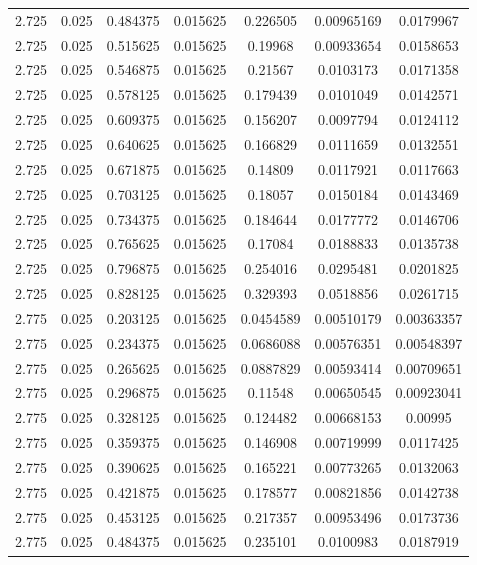 \begin{table}[bh]
\begin{center}
{\begin{tabular}{ccccccc}
2.725	 & 0.025 & 	0.484375	 & 0.015625	 & 0.226505	 & 0.00965169	 & 0.0179967 \\ 
2.725	 & 0.025 & 	0.515625	 & 0.015625	 & 0.19968	 & 0.00933654	 & 0.0158653 \\ 
2.725	 & 0.025 & 	0.546875	 & 0.015625	 & 0.21567	 & 0.0103173	 & 0.0171358 \\ 
2.725	 & 0.025 & 	0.578125	 & 0.015625	 & 0.179439	 & 0.0101049	 & 0.0142571 \\ 
2.725	 & 0.025 & 	0.609375	 & 0.015625	 & 0.156207	 & 0.0097794	 & 0.0124112 \\ 
2.725	 & 0.025 & 	0.640625	 & 0.015625	 & 0.166829	 & 0.0111659	 & 0.0132551 \\ 
2.725	 & 0.025 & 	0.671875	 & 0.015625	 & 0.14809	 & 0.0117921	 & 0.0117663 \\ 
2.725	 & 0.025 & 	0.703125	 & 0.015625	 & 0.18057	 & 0.0150184	 & 0.0143469 \\ 
2.725	 & 0.025 & 	0.734375	 & 0.015625	 & 0.184644	 & 0.0177772	 & 0.0146706 \\ 
2.725	 & 0.025 & 	0.765625	 & 0.015625	 & 0.17084	 & 0.0188833	 & 0.0135738 \\ 
2.725	 & 0.025 & 	0.796875	 & 0.015625	 & 0.254016	 & 0.0295481	 & 0.0201825 \\ 
2.725	 & 0.025 & 	0.828125	 & 0.015625	 & 0.329393	 & 0.0518856	 & 0.0261715 \\ 
2.775	 & 0.025 & 	0.203125	 & 0.015625	 & 0.0454589	 & 0.00510179	 & 0.00363357 \\ 
2.775	 & 0.025 & 	0.234375	 & 0.015625	 & 0.0686088	 & 0.00576351	 & 0.00548397 \\ 
2.775	 & 0.025 & 	0.265625	 & 0.015625	 & 0.0887829	 & 0.00593414	 & 0.00709651 \\ 
2.775	 & 0.025 & 	0.296875	 & 0.015625	 & 0.11548	 & 0.00650545	 & 0.00923041 \\ 
2.775	 & 0.025 & 	0.328125	 & 0.015625	 & 0.124482	 & 0.00668153	 & 0.00995 \\ 
2.775	 & 0.025 & 	0.359375	 & 0.015625	 & 0.146908	 & 0.00719999	 & 0.0117425 \\ 
2.775	 & 0.025 & 	0.390625	 & 0.015625	 & 0.165221	 & 0.00773265	 & 0.0132063 \\ 
2.775	 & 0.025 & 	0.421875	 & 0.015625	 & 0.178577	 & 0.00821856	 & 0.0142738 \\ 
2.775	 & 0.025 & 	0.453125	 & 0.015625	 & 0.217357	 & 0.00953496	 & 0.0173736 \\ 
2.775	 & 0.025 & 	0.484375	 & 0.015625	 & 0.235101	 & 0.0100983	 & 0.0187919 \\ 

\end{tabular}}
\end{center}
\end{table}
